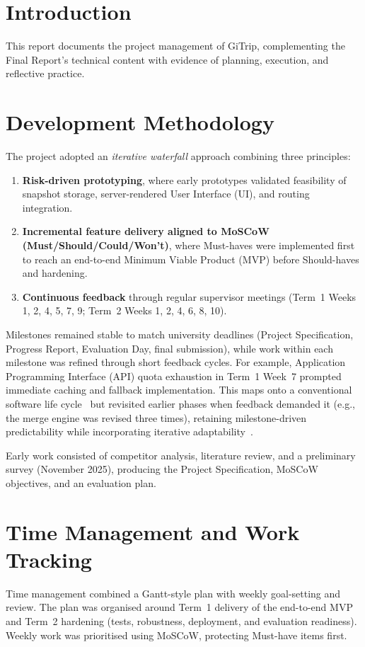 \documentclass[pdftex,11pt,a4paper,oneside]{article}
\begin{document}
\section{Introduction}

This report documents the project management of GiTrip, complementing the
Final Report's technical content with evidence of planning, execution, and
reflective practice.

\section{Development Methodology}
\label{sec:methodology}

The project adopted an \emph{iterative waterfall} approach combining three principles: 
\begin{enumerate}
    \item \textbf{Risk-driven prototyping}, where early prototypes validated feasibility of snapshot storage, server-rendered User Interface (UI), and routing integration.
    \item \textbf{Incremental feature delivery aligned to MoSCoW (Must/Should/Could/Won't)}, where Must-haves were implemented first to reach an end-to-end Minimum Viable Product (MVP) before Should-haves and hardening.
    \item \textbf{Continuous feedback} through regular supervisor meetings (Term~1 Weeks 1, 2, 4, 5, 7, 9; Term~2 Weeks 1, 2, 4, 6, 8, 10).
\end{enumerate}
Milestones remained stable to match university deadlines (Project Specification, Progress Report, Evaluation Day, final submission), while work within each milestone was refined through short feedback cycles. For example, Application Programming Interface (API) quota exhaustion in Term~1 Week~7 prompted immediate caching and fallback implementation. This maps onto a conventional software life cycle~\cite{ref_sommerville} but revisited earlier phases when feedback demanded it (e.g., the merge engine was revised three times), retaining milestone-driven predictability while incorporating iterative adaptability~\cite{ref_sommerville}.

Early work consisted of competitor analysis, literature review, and a preliminary survey (November 2025), producing the Project Specification, MoSCoW objectives, and an evaluation plan.

\section{Time Management and Work Tracking}
Time management combined a Gantt-style plan with weekly goal-setting and review.
The plan was organised around Term~1 delivery of the end-to-end MVP and Term~2 hardening (tests, robustness, deployment, and evaluation
readiness). Weekly work was prioritised using MoSCoW,
protecting Must-have items first.
\end{document}
